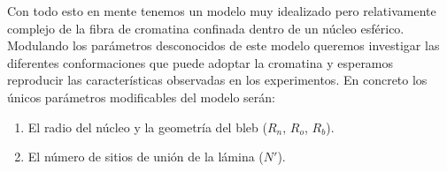 Con todo esto en mente tenemos un modelo muy idealizado pero relativamente complejo de la fibra de cromatina confinada dentro de un núcleo esférico. Modulando los parámetros desconocidos de este modelo queremos investigar las diferentes conformaciones que puede adoptar la cromatina y esperamos reproducir las características observadas en los experimentos. En concreto los únicos parámetros modificables del modelo serán:
\begin{enumerate}
    \item El radio del núcleo y la geometría del bleb ($R_n$, $R_o$, $R_b$).
    \item El número de sitios de unión de la lámina ($N'$).
\end{enumerate}
